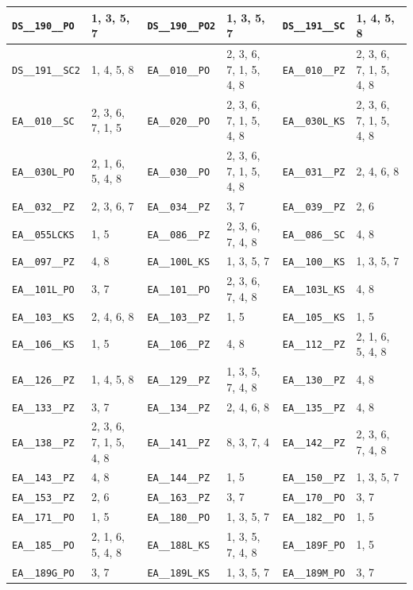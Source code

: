 \begin{longtable}{|l|l||l|l||l|l|}
    \verb|DS__190__PO| & 1, 3, 5, 7 & \verb|DS__190__PO2| & 1, 3, 5, 7 & \verb|DS__191__SC| & 1, 4, 5, 8\\\hline
    \verb|DS__191__SC2| & 1, 4, 5, 8 & \verb|EA__010__PO| & 2, 3, 6, 7, 1, 5, 4, 8 & \verb|EA__010__PZ| & 2, 3, 6, 7, 1, 5, 4, 8\\\hline
    \verb|EA__010__SC| & 2, 3, 6, 7, 1, 5 & \verb|EA__020__PO| & 2, 3, 6, 7, 1, 5, 4, 8 & \verb|EA__030L_KS| & 2, 3, 6, 7, 1, 5, 4, 8\\\hline
    \verb|EA__030L_PO| & 2, 1, 6, 5, 4, 8 & \verb|EA__030__PO| & 2, 3, 6, 7, 1, 5, 4, 8 & \verb|EA__031__PZ| & 2, 4, 6, 8\\\hline
    \verb|EA__032__PZ| & 2, 3, 6, 7 & \verb|EA__034__PZ| & 3, 7 & \verb|EA__039__PZ| & 2, 6\\\hline
    \verb|EA__055LCKS| & 1, 5 & \verb|EA__086__PZ| & 2, 3, 6, 7, 4, 8 & \verb|EA__086__SC| & 4, 8\\\hline
    \verb|EA__097__PZ| & 4, 8 & \verb|EA__100L_KS| & 1, 3, 5, 7 & \verb|EA__100__KS| & 1, 3, 5, 7\\\hline
    \verb|EA__101L_PO| & 3, 7 & \verb|EA__101__PO| & 2, 3, 6, 7, 4, 8 & \verb|EA__103L_KS| & 4, 8\\\hline
    \verb|EA__103__KS| & 2, 4, 6, 8 & \verb|EA__103__PZ| & 1, 5 & \verb|EA__105__KS| & 1, 5\\\hline
    \verb|EA__106__KS| & 1, 5 & \verb|EA__106__PZ| & 4, 8 & \verb|EA__112__PZ| & 2, 1, 6, 5, 4, 8\\\hline
    \verb|EA__126__PZ| & 1, 4, 5, 8 & \verb|EA__129__PZ| & 1, 3, 5, 7, 4, 8 & \verb|EA__130__PZ| & 4, 8\\\hline
    \verb|EA__133__PZ| & 3, 7 & \verb|EA__134__PZ| & 2, 4, 6, 8 & \verb|EA__135__PZ| & 4, 8\\\hline
    \verb|EA__138__PZ| & 2, 3, 6, 7, 1, 5, 4, 8 & \verb|EA__141__PZ| & 8, 3, 7, 4 & \verb|EA__142__PZ| & 2, 3, 6, 7, 4, 8\\\hline
    \verb|EA__143__PZ| & 4, 8 & \verb|EA__144__PZ| & 1, 5 & \verb|EA__150__PZ| & 1, 3, 5, 7\\\hline
    \verb|EA__153__PZ| & 2, 6 & \verb|EA__163__PZ| & 3, 7 & \verb|EA__170__PO| & 3, 7\\\hline
    \verb|EA__171__PO| & 1, 5 & \verb|EA__180__PO| & 1, 3, 5, 7 & \verb|EA__182__PO| & 1, 5\\\hline
    \verb|EA__185__PO| & 2, 1, 6, 5, 4, 8 & \verb|EA__188L_KS| & 1, 3, 5, 7, 4, 8 & \verb|EA__189F_PO| & 1, 5\\\hline
    \verb|EA__189G_PO| & 3, 7 & \verb|EA__189L_KS| & 1, 3, 5, 7 & \verb|EA__189M_PO| & 3, 7\\\hline

\end{longtable}
